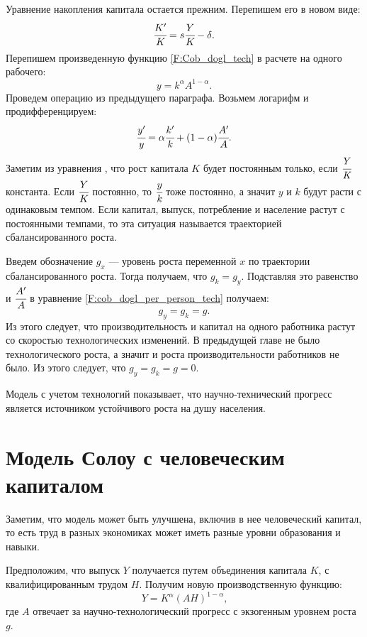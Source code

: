 Уравнение накопления капитала остается прежним. Перепишем его в новом виде:
\begin{equation}
\cfrac{K'}{K} = s \cfrac{Y}{K} - \delta\text{.}
\end{equation}\label{F:capital_solow_tech}
Перепишем произведенную функцию \ref{F:Cob_dogl_tech} в расчете на одного рабочего:
\begin{equation*}
y=k^{\alpha}A^{1 - \alpha}\text{.}
\end{equation*}
Проведем операцию из предыдущего параграфа.
Возьмем логарифм и продифференцируем:
\begin{equation}
\cfrac{y'}{y} = \alpha \cfrac{k'}{k} + (1 - \alpha) \cfrac{A'}{A}\text{.}
\label{F:cob_dogl_per_person_tech}
\end{equation}
Заметим из уравнения \label{F:capital_solow_tech}, что рост капитала $K$ будет постоянным только, если $\cfrac{Y}{K}$ константа.
Если $\cfrac{Y}{K}$ постоянно, то $\cfrac{y}{k}$ тоже постоянно, а значит $y$ и $k$ будут расти с одинаковым темпом.
Если капитал, выпуск, потребление и население растут с постоянными темпами, то эта ситуация называется траекторией сбалансированного роста.

Введем обозначение $g_{x}$ --- уровень роста переменной $x$ по траектории сбалансированного роста.
Тогда получаем, что $g_{k} = g_{y}$. Подставляя это равенство и $\cfrac{A'}{A}$ в уравнение \ref{F:cob_dogl_per_person_tech} получаем:
\begin{equation*}
g_{y} = g_{k}=g\text{.}
\end{equation*}
Из этого следует, что производительность и капитал на одного работника растут со скоростью технологических изменений.
В предыдущей главе не было технологического роста, а значит и роста производительности работников не было.
Из этого следует, что $g_{y}=g_{k}=g=0$.

Модель с учетом технологий показывает, что научно-технический прогресс является источником устойчивого роста на душу населения.

\section{Модель Солоу с человеческим капиталом}

Заметим, что модель может быть улучшена, включив в нее человеческий капитал, то есть труд в разных экономиках может иметь разные уровни образования и навыки.

Предположим, что выпуск $Y$ получается путем объединения капитала $K$, с квалифицированным трудом $H$.
Получим новую производственную функцию:
\begin{equation}
Y=K^{\alpha}(AH)^{1-\alpha}\text{,}
\end{equation}
где $A$ отвечает за научно-технологический прогресс с экзогенным уровнем роста $g$.

